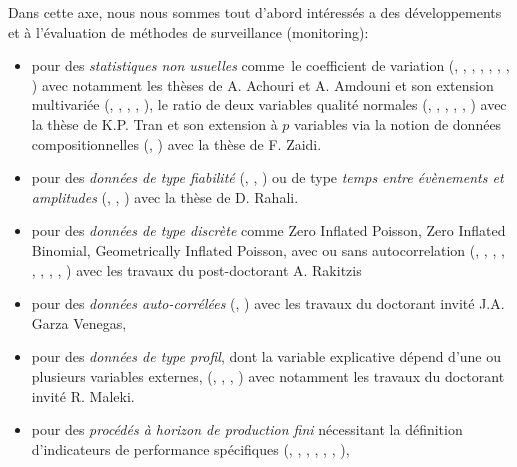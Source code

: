 Dans cette axe, nous nous sommes tout d'abord intéressés a des
développements et à l'évaluation de méthodes de surveillance
(monitoring):
\begin{itemize}
\item pour des \emph{statistiques non usuelles} comme le coefficient
  de variation (\cite{yeong:hal-01716541},
  \cite{amdouni:hal-01573597}, \cite{you:hal-01351488},
  \cite{teoh:hal-01381673}, \cite{amdouni:hal-01388503},
  \cite{castagliola:hal-01083082}, \cite{castagliola:hal-01202423},
  \cite{amdouni:hal-01202424}) avec notamment les thèses de A. Achouri
  et A. Amdouni et son extension multivariée
  (\cite{khatun:hal-02072237}, \cite{nguyen:hal-01885435},
  \cite{ginerbosch:hal-02283481}, \cite{khaw:hal-01895172},
  \cite{yeong:hal-01307037}), le ratio de deux variables qualité
  normales (\cite{tran:hal-01773342}, \cite{celano:hal-01264243},
  \cite{celano:hal-01272650}, \cite{tran:hal-01308072},
  \cite{tran:hal-01345854}, \cite{tran:hal-01396009}) avec la thèse de
  K.P. Tran et son extension à $p$ variables via la notion de données
  compositionnelles (\cite{zaidi:hal-02273060},
  \cite{tran:hal-01731361}) avec la thèse de F. Zaidi.
\item pour des \emph{données de type fiabilité}
  (\cite{haghighi:hal-02183425}, \cite{castagliola:hal-01204508},
  \cite{haghighi:hal-01264248}) ou de type \emph{temps entre
    évènements et amplitudes} (\cite{rahali:hal-02135093},
  \cite{qu:hal-01809531}, \cite{qu:hal-01895010}) avec la thèse de
  D. Rahali.
\item pour des \emph{données de type discrète} comme Zero Inflated
  Poisson, Zero Inflated Binomial, Geometrically Inflated Poisson,
  avec ou sans autocorrelation (\cite{rakitzis:hal-01718089},
  \cite{rakitzis:hal-01466793}, \cite{rakitzis:hal-01659129},
  \cite{bersimis:hal-01676808}, \cite{rakitzis:hal-01231367},
  \cite{rakitzis:hal-01331381}, \cite{rakitzis:hal-01345886},
  \cite{rakitzis:hal-01345887}, \cite{rakitzis:hal-01166916}) avec les
  travaux du post-doctorant A. Rakitzis
\item pour des \emph{données auto-corrélées}
  (\cite{garzavenegas:hal-01824643}, \cite{franco:hal-01169579}) avec
  les travaux du doctorant invité J.A. Garza Venegas,
\item pour des \emph{données de type profil}, dont la variable
  explicative dépend d'une ou plusieurs variables externes,
  (\cite{maleki:hal-02183432}, \cite{maleki:hal-01870773},
  \cite{maleki:hal-01905445}, \cite{guevara:hal-01580777}) avec
  notamment les travaux du doctorant invité R. Maleki.
\item pour des \emph{procédés à horizon de production fini}
  nécessitant la définition d'indicateurs de performance spécifiques
  (\cite{chong:hal-01978750}, \cite{celano:hal-01921379},
  \cite{celano:hal-01921386}, \cite{nenes:hal-01425549},
  \cite{celano:hal-01313577}, \cite{celano:hal-01367280},
  \cite{celano:hal-01382239}),
\end{itemize}

